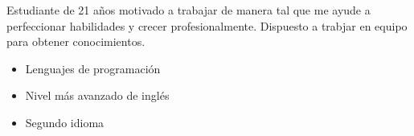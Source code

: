 \documentclass[10pt,a4paper,ragged2e,withhyper]{altacv}
\begin{document}
\begin{paracol}{2}







Estudiante de 21 años motivado a trabajar de manera tal que me ayude a perfeccionar habilidades y crecer profesionalmente. Dispuesto a trabjar en equipo para obtener conocimientos.



\divider
{}
 \divider







\divider
{}
\divider
{}
\divider
{}
\divider
{}
\divider
{}
\divider
{}
\divider

\begin{itemize}
\item Lenguajes de programación 
\item Nivel más avanzado de inglés
\item Segundo idioma
\end{itemize}

\end{paracol}
\end{document}
